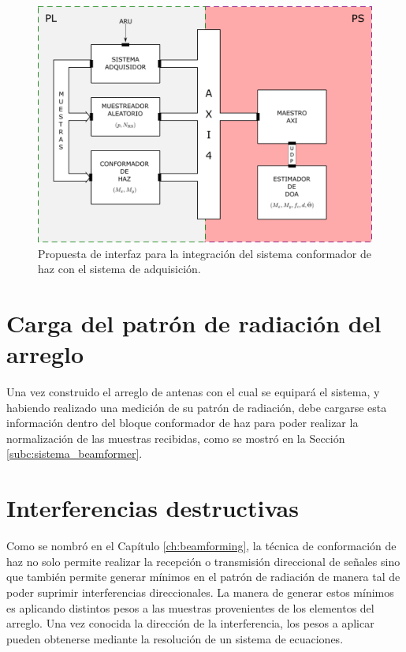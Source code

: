 \begin{figure}[ht!]
    \centering
    \includegraphics[width=0.9\linewidth]{images/08-Futuro/futuro_interfaz.png}
    \caption{Propuesta de interfaz para la integración del sistema conformador de haz con el sistema de adquisición.}
    \label{fig:futuro_interfaz}
\end{figure}

\section{Carga del patrón de radiación del arreglo}\label{subc:futuro_patron}
Una vez construido el arreglo de antenas con el cual se equipará el sistema, y habiendo realizado una medición de su patrón de radiación, debe cargarse esta información dentro del bloque conformador de haz para poder realizar la normalización de las muestras recibidas, como se mostró en la Sección \ref{subc:sistema_beamformer}.

\section{Interferencias destructivas}
Como se nombró en el Capítulo \ref{ch:beamforming}, la técnica de conformación de haz no solo permite realizar la recepción o transmisión direccional de señales sino que también permite generar mínimos en el patrón de radiación de manera tal de poder suprimir interferencias direccionales. La manera de generar estos mínimos es aplicando distintos pesos a las muestras provenientes de los elementos del arreglo. Una vez conocida la dirección de la interferencia, los pesos a aplicar pueden obtenerse mediante la resolución de un sistema de ecuaciones.

